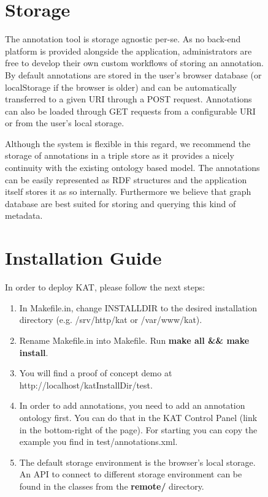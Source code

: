 \documentclass[a4paper, 12pt, notitlepage]{report}
\def\KAT{\textsf{KAT}\xspace}
\begin{document}
\begin{figure}[ht]
\section{Storage}

The annotation tool is storage agnostic per-se. As no back-end platform is provided
alongside the application, administrators are free to develop their own custom workflows
of storing an annotation. By default annotations are stored in the user's browser database
(or localStorage if the browser is older) and can be automatically transferred to a given
URI through a POST request. Annotations can also be loaded through GET requests from a
configurable URI or from the user's local storage.

Although the system is flexible in this regard, we recommend the storage of annotations in
a triple store as it provides a nicely continuity with the existing ontology based model.
The annotations can be easily represented as RDF structures and the application itself
stores it as so internally. Furthermore we believe that graph database are best suited for
storing and querying this kind of metadata.

\appendix

\section{Installation Guide}

In order to deploy \KAT, please follow the next steps:

\begin{enumerate}
\item In Makefile.in, change INSTALLDIR to the desired installation directory
  (e.g. /srv/http/kat or /var/www/kat).
\item Rename Makefile.in into Makefile. Run \textbf{make all \&\& make install}.
\item You will find a proof of concept demo at http://localhost/katInstallDir/test.
\item In order to add annotations, you need to add an annotation ontology first. You can
  do that in the \KAT Control Panel (link in the bottom-right of the page). For starting
  you can copy the example you find in test/annotations.xml.
\item The default storage environment is the browser's local storage. An API to connect to
  different storage environment can be found in the classes from the \textbf{remote/}
  directory.
\end{enumerate}


\end{figure}
\end{document}
